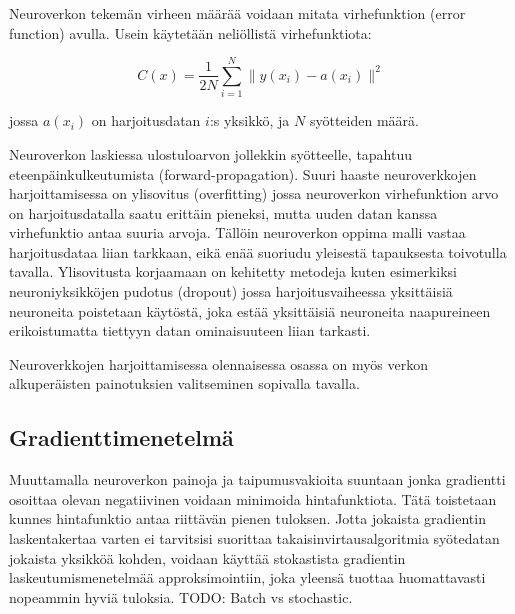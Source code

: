 \documentclass[finnish]{tktltiki2}
\theoremstyle{definition}
\theoremstyle{remark}
\begin{document}
  Neuroverkon tekemän virheen määrää voidaan mitata virhefunktion (error function) avulla. Usein käytetään neliöllistä virhefunktiota:

    $$C(x) = \frac{1}{2N} \sum_{i=1}^{N} \| y(x_i)-a(x_i) \|^2$$

  jossa $a(x_i)$ on harjoitusdatan $i$:s yksikkö, ja $N$ syötteiden määrä.


  Neuroverkon laskiessa ulostuloarvon jollekkin syötteelle, tapahtuu eteenpäinkulkeutumista (forward-propagation). 
  Suuri haaste neuroverkkojen harjoittamisessa on ylisovitus (overfitting) jossa neuroverkon virhefunktion arvo on harjoitusdatalla saatu erittäin pieneksi, mutta uuden datan kanssa virhefunktio antaa suuria arvoja. Tällöin neuroverkon oppima malli vastaa harjoitusdataa liian tarkkaan, eikä enää suoriudu yleisestä tapauksesta toivotulla tavalla. Ylisovitusta korjaamaan on kehitetty metodeja kuten esimerkiksi neuroniyksikköjen pudotus (dropout) jossa harjoitusvaiheessa yksittäisiä neuroneita poistetaan käytöstä, joka estää yksittäisiä neuroneita naapureineen erikoistumatta tiettyyn datan ominaisuuteen liian tarkasti.

  Neuroverkkojen harjoittamisessa olennaisessa osassa on myös verkon alkuperäisten painotuksien valitseminen sopivalla tavalla.

  \subsection{Gradienttimenetelmä} %

  Muuttamalla neuroverkon painoja ja taipumusvakioita suuntaan jonka gradientti osoittaa olevan negatiivinen voidaan minimoida hintafunktiota. Tätä toistetaan kunnes hintafunktio antaa riittävän pienen tuloksen. Jotta jokaista gradientin laskentakertaa varten ei tarvitsisi suorittaa takaisinvirtausalgoritmia syötedatan jokaista yksikköä kohden, voidaan käyttää stokastista gradientin laskeutumismenetelmää approksimointiin, joka yleensä tuottaa huomattavasti nopeammin hyviä tuloksia. TODO: Batch vs stochastic.

\end{document}
